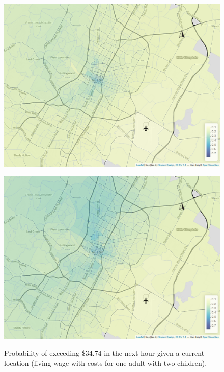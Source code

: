 \begin{figure}[htb]
\begin{minipage}[t]{.48\linewidth}
        \centering
        \includegraphics[width=\linewidth]{img/tailprob_34_74__142.png}
        \label{fig:wages:appendix3:c}
    \end{minipage}
    \begin{minipage}[t]{0.48\linewidth}
        \centering
        \includegraphics[width=\linewidth]{img/tailprob_34_74__168.png}
        \label{fig:wages:appendix3:d}
    \end{minipage}
    \caption{Probability of exceeding \$34.74 in the next hour given a current location (living wage with costs for one adult with two children).}
    \label{fig:wages:appendix3}
\end{figure}

